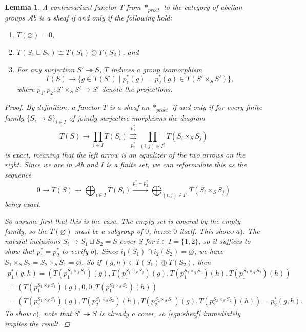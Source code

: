 \documentclass[11pt,A4]{article}
\theoremstyle{plain}
\newtheorem{lm}[thm]{Lemma}
\theoremstyle{definition}
\theoremstyle{remark}
\newcommand{\Ab}{\mathscr{A}b}
\newcommand{\pe}{*_{pro\acute et}}
\newcommand{\op}{\oplus}
\begin{document}
\begin{lm}\label{lm:pesheaves}
    A contravariant functor $T$ from $\pe$ to the category of abelian groups $\Ab$ is a sheaf if and only if the following hold:
    \begin{enumerate}[label=\alph*)]
	\item $T(\varnothing)=0$,
	\item $T(S_{1}\sqcup S_{2})\cong T(S_{1})\op T(S_{2})$, and
	\item For any surjection $S'\twoheadrightarrow S$, $T$ induces a group isomorphism
	    \[ T(S)\to \{ g\in T(S') \mid p_{1}^{*}(g)=p_{2}^{*}(g) \in T(S'\times_{S}S') \}, \]
	    where $p_{1},p_{2}\colon S'\times_{S}S'\to S'$ denote the projections.
    \end{enumerate}
    \begin{proof}
	By definition, a functor $T$ is a sheaf on $\pe$ if and only if for every finite family $\{ S_{i}\to S\}_{i\in I}$ of jointly surjective morphisms the diagram
	\[ T(S)\to \prod_{i\in I} T(S_{i})\overset{p_{1}^{*}}{\underset{p_{2}^{*}}{\rightrightarrows}}\prod_{(i,j)\in I^{2}} T(S_{i}\times_{S} S_{j}) \]
	is exact, meaning that the left arrow is an equalizer of the two arrows on the right.
	Since we are in $\Ab$ and $I$ is a finite set, we can reformulate this as the sequence
	\begin{equation}\label{eqn:sheaf}
	    0\to T(S)\to \bigoplus_{i\in I} T(S_{i})\xrightarrow{p_{1}^{*}-p_{2}^{*}} \bigoplus_{(i,j)\in I^{2}} T(S_{i}\times_{S}S_{j})
	\end{equation}
	being exact.

	So assume first that this is the case.
	The empty set is covered by the empty family, so the $T(\varnothing)$ must be a subgroup of $0$, hence $0$ itself.
	This shows $a)$.
	The natural inclusions $S_{i}\to S_{1}\sqcup S_{2}=S$ cover $S$ for $i\in I=\{1,2\}$, so it suffices to show that $p_{1}^{*}=p_{2}^{*}$ to verify $b)$.
	Since $i_{1}(S_{1})\cap i_{2}(S_{2})=\varnothing $, we have $S_{1}\times_{S}S_{2}=S_{2}\times_{S}S_{1}=\varnothing $.
	So if $(g,h)\in T(S_{1})\op T(S_{2})$, then
	\begin{multline*}
	    p_{1}^{*}(g,h)=(T(p_{1}^{S_{1}\times_{S}S_{1}})(g),T(p_{1}^{S_{1}\times_{S}S_{2}})(g),T(p_{1}^{S_{2}\times_{S}S_{1}})(h),T(p_{1}^{S_{2}\times_{S}S_{2}})(h)) \\ 
	    =(T(p_{1}^{S_{1}\times_{S}S_{1}})(g),0,0,T(p_{1}^{S_{2}\times_{S}S_{2}})(h)) \\
	    =(T(p_{2}^{S_{1}\times_{S}S_{1}})(g),T(p_{2}^{S_{1}\times_{S}S_{2}})(h),T(p_{2}^{S_{2}\times_{S}S_{1}})(g),T(p_{2}^{S_{2}\times_{S}S_{2}})(h))=p_{2}^{*}(g,h).
	\end{multline*}
	To show $c)$, note that $S'\twoheadrightarrow S$ is already a cover, so \cref{eqn:sheaf} immediately implies the result.


\end{proof}
\end{lm}
\end{document}
